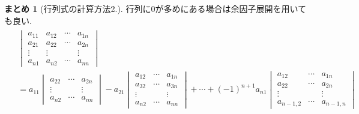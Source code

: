 \documentclass[dvipdfmx,a4paper,11pt]{article}
\theoremstyle{definition}
\newtheorem{suma}[thm]{まとめ}
\begin{document}
\begin{tcolorbox}[
    colback = white,
    colframe = green!35!black,
    fonttitle = \bfseries,
    breakable = true]
    \begin{suma}[行列式の計算方法2.]
    行列に0が多めにある場合は余因子展開を用いても良い.
    \begin{align*}
\begin{split}
&\begin{vmatrix}
a_{11} & a_{12} & \cdots & a_{1n} \\
a_{21} & a_{22} & \cdots & a_{2n} \\
\vdots & \vdots & & \vdots \\
a_{n1} & a_{n2} & \cdots & a_{nn}
\end{vmatrix}\\
&=
a_{11} 
\begin{vmatrix}
a_{22} & \cdots & a_{2n} \\
\vdots & & \vdots \\
a_{n2} & \cdots & a_{nn}
\end{vmatrix}
- a_{21}
\begin{vmatrix}
a_{12} & \cdots & a_{1n} \\
a_{32} & \cdots & a_{3n} \\
\vdots & & \vdots \\
a_{n2} & \cdots & a_{nn}
\end{vmatrix}
+ \cdots + (-1)^{n+1} a_{n1}
\begin{vmatrix}
a_{12} & \cdots & a_{1n} \\
a_{22} & \cdots & a_{2n} \\
\vdots & & \vdots \\
a_{n-1,2} & \cdots & a_{n-1,n}
\end{vmatrix}
\end{split}
\end{align*}
\end{suma}
\end{tcolorbox}
\end{document}
